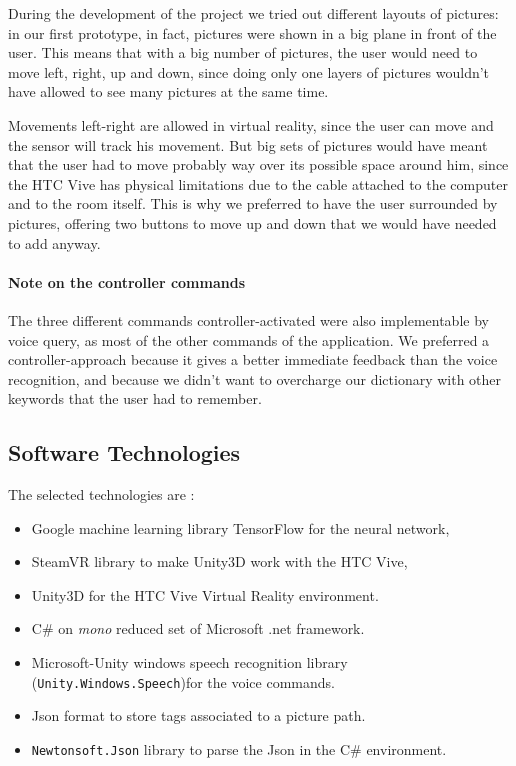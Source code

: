 \documentclass[11pt,a4paper]{article}
\begin{document}
During the development of the project we tried out different layouts of pictures: in our first prototype, in fact, pictures were shown in a big plane in front of the user. This means that with a big number of pictures, the user would need to move left, right, up and down, since doing only one layers of pictures wouldn't have allowed to see many pictures at the same time.

Movements left-right are allowed in virtual reality, since the user can move and the sensor will track his movement. But big sets of pictures would have meant that the user had to move probably way over its possible space around him, since the HTC Vive has physical limitations due to the cable attached to the computer and to the room itself.
This is why we preferred to have the user surrounded by pictures, offering two buttons to move up and down that we would have needed to add anyway.

\paragraph{Note on the controller commands} The three different commands controller-activated were also implementable by voice query, as most of the other commands of the application.
We preferred a controller-approach because it gives a better immediate feedback than the voice recognition, and because we didn't want to overcharge our dictionary with other keywords that the user had to remember.
\subsection{Software Technologies} \label{techntechno}

The selected technologies are :
\begin{itemize}
	\item Google machine learning library TensorFlow for the neural network,
	\item SteamVR library to make Unity3D work with the HTC Vive,
	\item Unity3D for the HTC Vive Virtual Reality environment.
	\item C$\#$ on \textit{mono} reduced set of Microsoft .net framework.
	\item Microsoft-Unity windows speech recognition library (\texttt{Unity.Windows.Speech})for the voice commands.
	\item Json format to store tags associated to a picture path.
	\item \texttt{Newtonsoft.Json} library to parse the Json in the C$\#$ environment.
\end{itemize}
\end{document}
